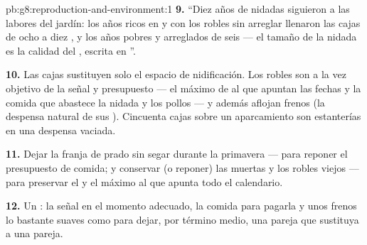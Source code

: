 \begin{solution}{pb:g8:reproduction-and-environment:1}
\textbf{9.} ``Diez años de nidadas siguieron a las labores del jardín:
los años ricos en  y con los robles sin arreglar llenaron las
cajas de ocho a diez , y los años pobres y arreglados de seis ---
el tamaño de la nidada es la calidad del , escrita en ''.

\textbf{10.} Las cajas sustituyen solo el espacio de nidificación. Los
robles son a la vez objetivo de la señal y presupuesto --- el máximo de
 al que apuntan las fechas y la comida que abastece la nidada y
los pollos --- y además aflojan frenos (la despensa natural de sus
). Cincuenta cajas sobre un aparcamiento son estanterías en una
despensa vaciada.

\textbf{11.} Dejar la franja de prado sin segar durante la primavera
--- para reponer el presupuesto de comida; y conservar (o reponer) las
 muertas y los robles viejos --- para preservar el  y el
máximo al que apunta todo el calendario.

\textbf{12.} Un : la señal en el momento adecuado, la comida
para pagarla y unos frenos lo bastante suaves como para dejar, por
término medio, una pareja que sustituya a una pareja.
\end{solution}

